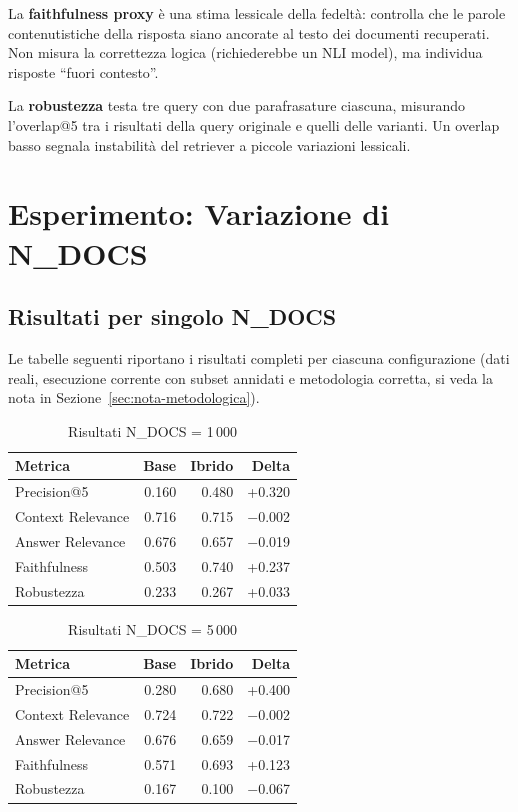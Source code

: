 \documentclass[12pt,a4paper]{article}
\begin{document}
La \textbf{faithfulness proxy} \`e una stima lessicale della fedelt\`a: controlla che le parole contenutistiche della risposta siano ancorate al testo dei documenti recuperati. Non misura la correttezza logica (richiederebbe un NLI model), ma individua risposte ``fuori contesto''.

La \textbf{robustezza} testa tre query con due parafrasature ciascuna, misurando l'overlap@5 tra i risultati della query originale e quelli delle varianti. Un overlap basso segnala instabilit\`a del retriever a piccole variazioni lessicali.

\section{Esperimento: Variazione di N\_DOCS}

\subsection{Risultati per singolo N\_DOCS}

Le tabelle seguenti riportano i risultati completi per ciascuna configurazione (dati reali, esecuzione corrente con subset annidati e metodologia corretta, si veda la nota in Sezione~\ref{sec:nota-metodologica}).

\begin{table}[H]
  \centering
  \caption{Risultati N\_DOCS = 1\,000}
  \begin{tabular}{lrrr}
    \toprule
    \textbf{Metrica} & \textbf{Base} & \textbf{Ibrido} & \textbf{Delta} \\
    \midrule
    Precision@5        & 0.160 & 0.480 & +0.320 \\
    Context Relevance  & 0.716 & 0.715 & $-$0.002 \\
    Answer Relevance   & 0.676 & 0.657 & $-$0.019 \\
    Faithfulness       & 0.503 & 0.740 & +0.237 \\
    Robustezza         & 0.233 & 0.267 & +0.033 \\
    \bottomrule
  \end{tabular}
\end{table}

\begin{table}[H]
  \centering
  \caption{Risultati N\_DOCS = 5\,000}
  \begin{tabular}{lrrr}
    \toprule
    \textbf{Metrica} & \textbf{Base} & \textbf{Ibrido} & \textbf{Delta} \\
    \midrule
    Precision@5        & 0.280 & 0.680 & +0.400 \\
    Context Relevance  & 0.724 & 0.722 & $-$0.002 \\
    Answer Relevance   & 0.676 & 0.659 & $-$0.017 \\
    Faithfulness       & 0.571 & 0.693 & +0.123 \\
    Robustezza         & 0.167 & 0.100 & $-$0.067 \\
    \bottomrule
  \end{tabular}
\end{table}
\end{document}
